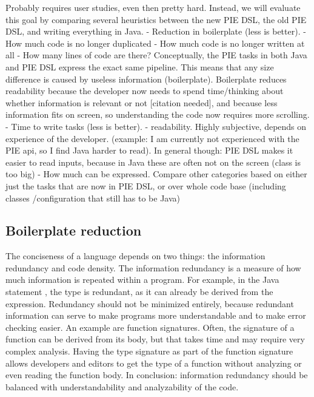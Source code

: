 Probably requires user studies, even then pretty hard.
Instead, we will evaluate this goal by comparing several heuristics between the new PIE DSL, the old PIE DSL, and writing everything in Java.
- Reduction in boilerplate (less is better).
  - How much code is no longer duplicated
  - How much code is no longer written at all
  - How many lines of code are there?
    Conceptually, the PIE tasks in both Java and PIE DSL express the exact same pipeline. This means that any size difference is caused by useless information (boilerplate).
    Boilerplate reduces readability because the developer now needs to spend time/thinking about whether information is relevant or not [citation needed], and because less information fits on screen, so understanding the code now requires more scrolling.
- Time to write tasks (less is better).
- readability. Highly subjective, depends on experience of the developer. (example: I am currently not experienced with the PIE api, so I find Java harder to read). In general though: PIE DSL makes it easier to read inputs, because in Java these are often not on the screen (class is too big)
- How much can be expressed. Compare other categories based on either just the tasks that are now in PIE DSL, or over whole code base (including classes /configuration that still has to be Java)





\subsection{Boilerplate reduction}
\label{subsec:evaluation__analysis__boilerplate_reduction}

The conciseness of a language depends on two things: the information redundancy and code density.
The information redundancy is a measure of how much information is repeated within a program.
For example, in the Java statement , the type  is redundant, as it can already be derived from the expression.
Redundancy should not be minimized entirely, because redundant information can serve to make programs more understandable and to make error checking easier.
An example are function signatures.
Often, the signature of a function can be derived from its body, but that takes time and may require very complex analysis.
Having the type signature as part of the function signature allows developers and editors to get the type of a function without analyzing or even reading the function body.
In conclusion: information redundancy should be balanced with understandability and analyzability of the code.

